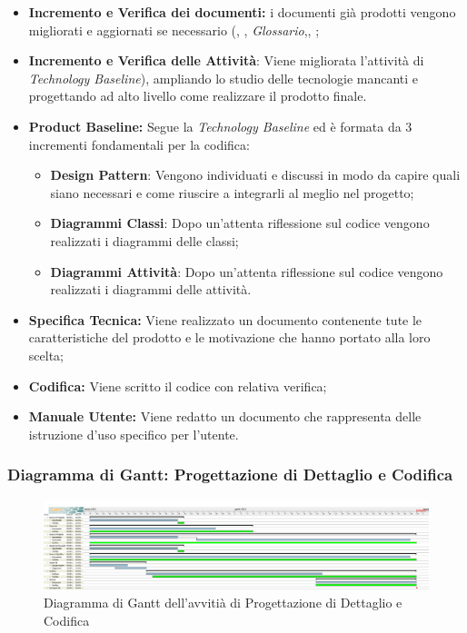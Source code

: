 \begin{itemize}
    \item \textbf{Incremento e Verifica dei documenti:} i documenti già prodotti vengono migliorati e aggiornati se necessario (\textit{\NdP}, \textit{\PdP}, \textit{Glossario},\textit{\PdQ}, \textit{\AdR}; 
    \item \textbf{Incremento e Verifica delle Attività}: Viene migliorata l'attività di \textit{Technology Baseline}), ampliando lo studio delle tecnologie mancanti e progettando ad alto livello come realizzare il prodotto finale.
    \item \textbf{Product Baseline:} Segue la \textit{Technology Baseline} ed è formata da 3 incrementi fondamentali per la codifica:
        \begin{itemize}
            \item \textbf{Design Pattern}: Vengono individuati e discussi in modo da capire quali siano necessari e come riuscire a integrarli al meglio nel progetto;
            \item \textbf{Diagrammi Classi}: Dopo un'attenta riflessione sul codice vengono realizzati i diagrammi delle classi;
            \item \textbf{Diagrammi Attività}: Dopo un'attenta riflessione sul codice vengono realizzati i diagrammi delle attività. 
        \end{itemize} 
    \item \textbf{Specifica Tecnica:} Viene realizzato un documento contenente tute le caratteristiche del prodotto e le motivazione che hanno portato alla loro scelta;
    \item \textbf{Codifica:} Viene scritto il codice con relativa verifica;
    \item \textbf{Manuale Utente:} Viene redatto un documento che rappresenta delle istruzione d'uso specifico per l'utente.
\end{itemize}

\newpage
\subsubsection{Diagramma di Gantt: Progettazione di Dettaglio e Codifica}
\begin{figure}[ht]
    \centering
    \includegraphics[width=\textwidth]{../../Immagini/GanttProgettazioneDiDettaglioECodifica}
    \caption{Diagramma di Gantt dell'avvitià di Progettazione di Dettaglio e Codifica}
\end{figure}